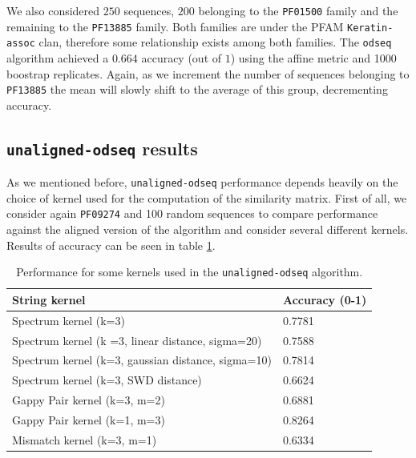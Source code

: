 \documentclass[a4paper]{llncs}
\begin{document}
We also considered $250$ sequences, $200$ belonging to the \texttt{PF01500} family and the remaining to the \texttt{PF13885} family. Both families are under the PFAM \texttt{Keratin-assoc} clan, therefore some relationship exists among both families. The \texttt{odseq} algorithm achieved a $0.664$ accuracy (out of $1$) using the affine metric and 1000 boostrap replicates. Again, as we increment the number of sequences belonging to \texttt{PF13885} the mean will slowly shift to the average of this group, decrementing accuracy.

\subsection{\texttt{unaligned-odseq} results}

As we mentioned before, \texttt{unaligned-odseq} performance depends heavily on the choice of kernel used for the computation of the similarity matrix. First of all, we consider again \texttt{PF09274} and 100 random sequences to compare performance against the aligned version of the algorithm and consider several different kernels. Results of accuracy can be seen in table \ref{accuracy_unal}.\\ 

\begin{table}[]
\centering
\caption{Performance for some kernels used in the \texttt{unaligned-odseq} algorithm.}
\label{accuracy_unal}
\begin{tabular}{@{}ll@{}}
\toprule
\textbf{String kernel}                               & \textbf{Accuracy (0-1)} \\ \midrule
Spectrum kernel (k=3)                                & 0.7781                  \\
Spectrum kernel (k =3, linear distance, sigma=20)  & 0.7588                  \\
Spectrum kernel (k=3, gaussian distance, sigma=10) & 0.7814                  \\
Spectrum kernel (k=3, SWD distance)                  & 0.6624                  \\
Gappy Pair kernel (k=3, m=2)                         & 0.6881                  \\
Gappy Pair kernel (k=1, m=3)                         & 0.8264                  \\
Mismatch kernel (k=3, m=1)                           & 0.6334                  \\ \bottomrule
\end{tabular}
\end{table}
\end{document}
